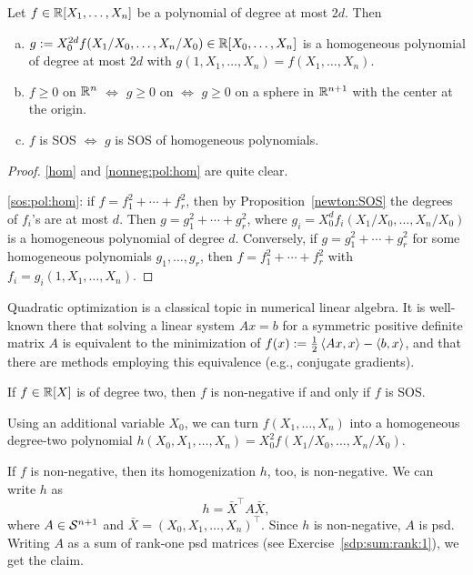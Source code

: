 \begin{lemma} \label{homogenization}
	Let $f \in \mathbb{R}[X_1,\ldots,X_n]$ be a polynomial of degree at most $2d$. Then
	\begin{enumerate}[(a)]
		\item \label{hom} $g:=X_0^{2d} f(X_1/X_0,\ldots,X_n/X_0) \in \mathbb{R}[X_0,\ldots,X_n]$ is a homogeneous polynomial of degree at most $2d$ with $g(1,X_1,\ldots,X_n) = f(X_1,\ldots,X_n)$.
		\item \label{nonneg:pol:hom} $f \ge 0$ on $\mathbb{R}^n$ $\Leftrightarrow$ $g \ge 0$ on  $\Leftrightarrow$ $g \ge 0$ on a sphere in $\mathbb{R}^{n+1}$ with the center at the origin.
		\item \label{sos:pol:hom} $f$ is SOS $\Leftrightarrow$ $g$ is SOS of homogeneous polynomials. 
	\end{enumerate}
\end{lemma}
\begin{proof}
	\eqref{hom} and \eqref{nonneg:pol:hom} are quite clear. 
	
	\eqref{sos:pol:hom}: if $f = f_1^2 + \cdots + f_r^2$, then by Proposition~\ref{newton:SOS} the degrees of $f_i$'s are at most $d$. Then $g = g_1^2 + \cdots + g_r^2$, where $g_i = X_0^d f_i(X_1/X_0,\ldots,X_n/X_0)$ is a homogeneous polynomial of degree $d$. Conversely, if $g= g_1^2  + \cdots + g_r^2$ for some homogeneous polynomials $g_1,\ldots,g_r$, then $f=f_1^2 + \cdots + f_r^2$ with $f_i = g_i(1,X_1,\ldots,X_n)$. 
\end{proof}

Quadratic optimization is a classical topic in numerical linear algebra. It is well-known there that solving a linear system $A x = b$ for a symmetric positive definite matrix $A$ is equivalent to the minimization of $f(x):=\frac{1}{2} \left\langle A x , x \right\rangle - \left\langle b , x \right\rangle$, and that there are methods employing this equivalence (e.g., conjugate gradients). 

\begin{exercise}
	\label{degree:two}
	If $f \in \mathbb{R}[X]$ is of degree two, then $f$ is non-negative if and only if $f$ is SOS. 
\end{exercise}
\begin{solution}
	Using an additional variable $X_0$, we can turn $f(X_1,\ldots,X_n)$ into a homogeneous degree-two polynomial $h(X_0,X_1,\ldots,X_n)=X_0^2 f(X_1 / X_0,\ldots,X_n / X_0 )$. 
	
	If $f$ is non-negative, then its homogenization $h$, too, is non-negative. We can write $h$ as 
	\[ h = \bar{X}^\top A \bar{X}, \] where $A \in \mathcal{S}^{n+1}$ and $\bar{X} = (X_0,X_1,\ldots,X_n)^\top$. Since $h$ is non-negative, $A$ is psd. Writing $A$ as a sum of rank-one psd matrices (see Exercise~\ref{sdp:sum:rank:1}), we get the claim. 
\end{solution}


